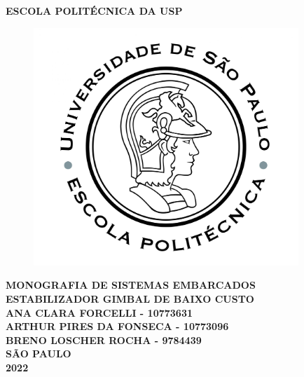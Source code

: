 \thispagestyle{empty}

\vfill
 \begin{center}
    {\large\bfseries ESCOLA POLITÉCNICA DA USP} \\
    \vspace*{1in}
    \begin{figure}[h]
     \centering
            \includegraphics[width=10cm]{figures/Logo_Poli.jpg}\\
     \end{figure}
    \vspace*{1in}
    \large\bfseries MONOGRAFIA DE SISTEMAS EMBARCADOS\\
    
    ESTABILIZADOR GIMBAL DE BAIXO CUSTO\\
    
    \vspace{1.5cm}
    ANA CLARA FORCELLI - 10773631\\
    ARTHUR PIRES DA FONSECA - 10773096\\
    BRENO LOSCHER ROCHA - 9784439\\
    \vfill
    \large\bfseries{ SÃO PAULO \\ 2022}
\end{center}

\normalsize
